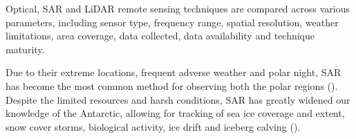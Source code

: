 \begin{table}[H]
\centering
\caption{Satellite Remote Sensing Techniques Comparison.}{Optical, SAR and LiDAR remote sensing techniques are compared across various parameters, including sensor type, frequency range, spatial resolution, weather limitations, area coverage, data collected, data availability and technique maturity.}
\label{tab:sense_comparison}
\end{table}

Due to their extreme locations, frequent adverse weather and polar night, \ac{SAR} has become the most common method for observing both the polar regions (\cite{comisoSatelliteRemoteSensing1991}). Despite the limited resources and harsh conditions, \ac{SAR} has greatly widened our knowledge of the Antarctic, allowing for tracking of sea ice coverage and extent, snow cover storms, biological activity, ice drift and iceberg calving (\cite{maslanikRemoteSensingAntarctica1990,dirscherlRemoteSensingIce2020,baumhoerRemoteSensingAntarctic2018}).

